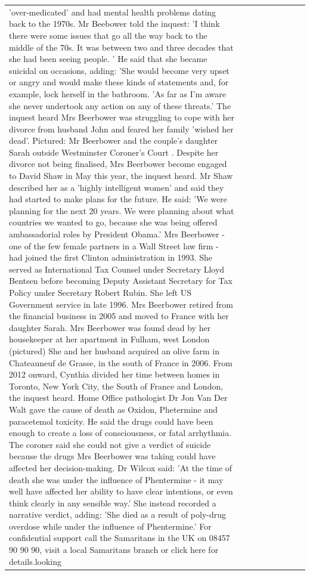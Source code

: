 \begin{table}[H]
\begin{tabular}{lllrlllll}
'over-medicated' and had mental health problems dating back to the 1970s. Mr Beebower told the inquest: 'I think there were some issues that go all the way back to the middle of the 70s. It was between two and three decades that she had been seeing people. ' He said that she became suicidal on occasions, adding: 'She would become very upset or angry and would make these kinds of statements and, for example, lock herself in the bathroom. 'As far as I'm aware she never undertook any action on any of these threats.' The inquest heard Mrs Beerbower was struggling to cope with her divorce from husband John and feared her family 'wished her dead'. Pictured: Mr Beerbower and the couple's daughter Sarah outside Westminster Coroner's Court . Despite her divorce not being finalised, Mrs Beerbower become engaged to David Shaw in May this year, the inquest heard. Mr Shaw described her as a 'highly intelligent women' and said they had started to make plans for the future. He said: 'We were planning for the next 20 years. We were planning about what countries we wanted to go, because she was being offered ambassadorial roles by President Obama.' Mrs Beerbower - one of the few female partners in a Wall Street law firm - had joined the first Clinton administration in 1993. She served as International Tax Counsel under Secretary Lloyd Bentsen before becoming Deputy Assistant Secretary for Tax Policy under Secretary Robert Rubin. She left US Government service in late 1996. Mrs Beerbower retired from the financial business in 2005 and moved to France with her daughter Sarah. Mrs Beerbower was found dead by her housekeeper at her apartment in Fulham, west London (pictured) She and her husband acquired an olive farm in Chateauneuf de Grasse, in the south of France in 2006. From 2012 onward, Cynthia divided her time between homes in Toronto, New York City, the South of France and London, the inquest heard. Home Office pathologist Dr Jon Van Der Walt gave the cause of death as Oxidon, Phetermine and paracetemol toxicity. He said the drugs could have been enough to create a loss of consciousness, or fatal arrhythmia. The coroner said she could not give a verdict of suicide because the drugs Mrs Beerbower was taking could have affected her decision-making. Dr Wilcox said: 'At the time of death she was under the influence of Phentermine - it may well have affected her ability to have clear intentions, or even think clearly in any sensible way.' She instead recorded a narrative verdict, adding: 'She died as a result of poly-drug overdose while under the influence of Phentermine.' For confidential support call the Samaritans in the UK on 08457 90 90 90, visit a local Samaritans branch or click here for details.looking \\

\end{tabular}
\end{table}
